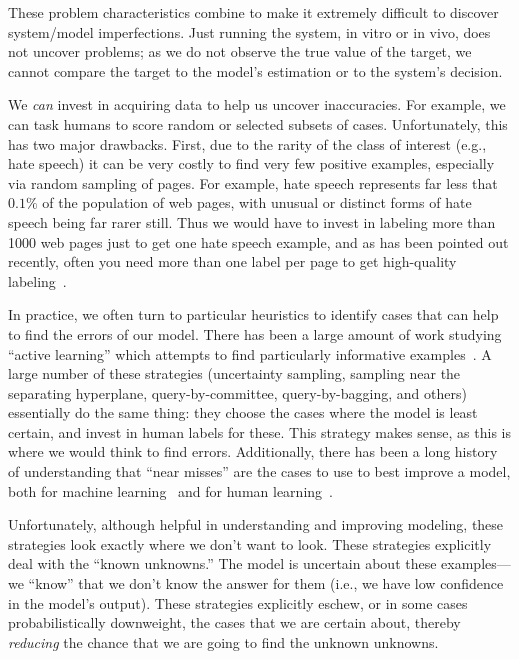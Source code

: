These problem characteristics combine to make it extremely difficult to
discover system/model imperfections.  Just running the system, in
vitro or in vivo, does not uncover problems; as we do not observe
the true value of the target, we cannot compare the target to the model's
estimation or to the system's decision.

We \textit{can} invest in acquiring data to help us uncover
inaccuracies.  For example, we can task humans to score random or
selected subsets of cases.  Unfortunately, this has two major
drawbacks.  First, due to the rarity of the class of interest (e.g.,
hate speech) it can be very costly to find very few positive examples,
especially via random sampling of pages.  For example, hate speech
represents far less that $0.1\%$ of the population of web pages, with unusual or distinct forms of hate speech being far rarer still. Thus we would
have to invest in labeling more than 1000 web pages just to get one hate speech
example, and as has been pointed out
recently, often you need more than one label per page to get
high-quality labeling~\cite{shengKDD2008,raykar2009supervised}.




In practice, we often turn to particular heuristics to identify
cases that can help to find the errors of our model.  There has been a
large amount of work studying ``active learning'' which attempts to
find particularly informative examples~\cite{SettlesActiveLearning}.
A large number of these strategies (uncertainty sampling, sampling
near the separating hyperplane, query-by-committee, query-by-bagging,
and others) essentially do the same thing: they choose the cases where
the model is least certain, and invest in human labels for these.
This strategy makes sense, as this is where we would think to find
errors.  Additionally, there has been a long history of understanding that
``near misses'' are the cases to use to best improve a model, both for
machine learning~\cite{winston1970learning} and for human
learning~\cite{vanlehn1998analogy}.

Unfortunately, although helpful in understanding and improving
modeling, these strategies look exactly where we don't want to look.
These strategies explicitly deal with the ``known unknowns.''  The
model is uncertain about these examples---we ``know'' that we don't
know the answer for them (i.e., we have low confidence in the model's
output).  These strategies explicitly eschew, or in some cases
probabilistically downweight, the cases that we are
certain about, thereby \textit{reducing} the chance that we are going
to find the unknown unknowns.

